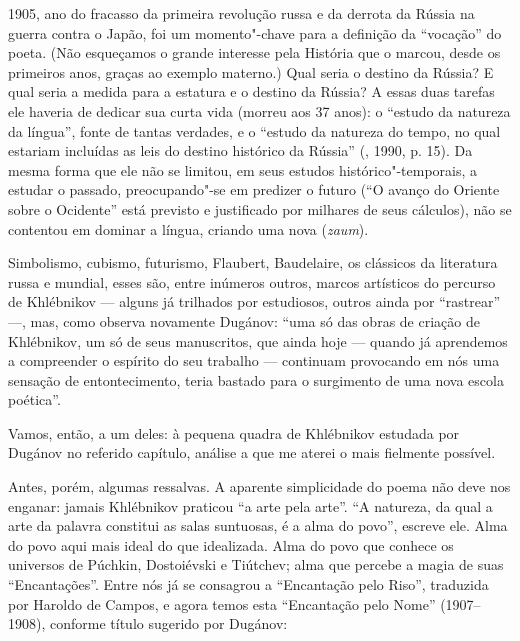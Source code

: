 1905, ano do fracasso da primeira revolução
russa e da derrota da Rússia na guerra contra o Japão, foi um momento"-chave
para a definição da ``vocação'' do poeta. (Não esqueçamos o
grande interesse pela História que o marcou, desde os primeiros
anos, graças ao exemplo materno.) Qual seria o destino da Rússia? E qual
seria a medida para a estatura e o destino da Rússia? A essas duas
tarefas ele haveria de dedicar sua curta vida (morreu aos
37 anos): o ``estudo da natureza da língua'', fonte de tantas verdades, e o
``estudo da natureza do tempo, no qual estariam incluídas as leis do
destino histórico da Rússia'' (, 1990, p. 15). Da mesma forma que ele não se limitou, em
seus estudos histórico"-temporais, a estudar o passado, preocupando"-se
em predizer o futuro (``O avanço do Oriente sobre o Ocidente'' está
previsto e justificado por milhares de seus cálculos), não se contentou em dominar a língua,
criando uma nova (\emph{zaum}).

Simbolismo, cubismo, futurismo, Flaubert, Baudelaire, os clássicos da
literatura russa e mundial, esses são, entre inúmeros outros, marcos
artísticos do percurso de Khlébnikov --- alguns já trilhados por estudiosos,
outros ainda por ``rastrear'' ---, mas, como observa novamente Dugánov: ``uma só das
obras de criação de Khlébnikov, um só de seus manuscritos, que ainda hoje
--- quando já aprendemos a compreender o espírito do seu trabalho ---
continuam provocando em nós uma sensação de entontecimento, teria
bastado para o surgimento de uma nova escola poética''.

Vamos, então, a um deles: à pequena quadra de Khlébnikov estudada por
Dugánov no referido capítulo, análise a que me aterei o mais fielmente
possível.

Antes, porém, algumas ressalvas. A aparente simplicidade do poema não
deve nos enganar: jamais Khlébnikov praticou ``a arte pela arte''. ``A
natureza, da qual a arte da palavra constitui as salas suntuosas, é a
alma do povo'', escreve ele. Alma do povo aqui mais ideal do que
idealizada. Alma do povo que conhece os universos de Púchkin,
Dostoiévski e Tiútchev; alma que percebe a magia de suas
``Encantações''. Entre nós já se consagrou a ``Encantação pelo Riso'',
traduzida por Haroldo de Campos, e agora temos esta
``Encantação pelo Nome'' (1907--1908), conforme título sugerido por
Dugánov:

